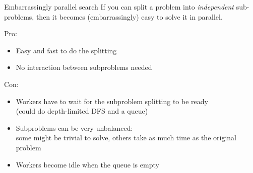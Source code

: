 \documentclass{cons-beamer}
\begin{document}
\begin{frame}{Embarrassingly parallel search}
	If you can split a problem into \textit{independent} sub-problems, then it becomes (embarrassingly) easy to solve it in parallel.
	\vfill
	
	Pro:
	\begin{itemize}
		\item Easy and fast to do the splitting
		\item No interaction between subproblems needed
	\end{itemize}
	
	Con:
	\begin{itemize}
		\item Workers have to wait for the subproblem splitting to be ready\\
		 (could do depth-limited DFS and a queue)
		\item Subproblems can be very unbalanced: \\
		  some might be trivial to solve, others take as much time as the original problem
		\item Workers become idle when the queue is empty
	\end{itemize}
\end{frame}
\end{document}
